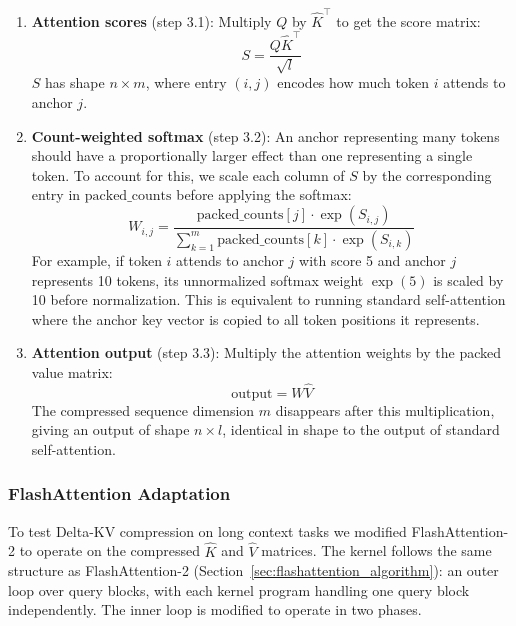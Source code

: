 \begin{enumerate}
    \item \textbf{Attention scores} (step 3.1): Multiply $Q$ by $\hat{K}^\top$ to get the score matrix:
    \begin{equation}
        S = \frac{Q\hat{K}^\top}{\sqrt{l}}
    \end{equation}
    $S$ has shape $n \times m$, where entry $(i, j)$ encodes how much token $i$ attends to anchor $j$.

    \item \textbf{Count-weighted softmax} (step 3.2): An anchor representing many tokens should have a proportionally larger effect than one representing a single token. To account for this, we scale each column of $S$ by the corresponding entry in $\text{packed\_counts}$ before applying the softmax:
    \begin{equation}
        \label{eq:count_weighted_softmax}
        W_{i,j} = \frac{\text{packed\_counts}[j] \cdot \exp(S_{i,j})}{\displaystyle\sum_{k=1}^{m} \text{packed\_counts}[k] \cdot \exp(S_{i,k})}
    \end{equation}
    For example, if token $i$ attends to anchor $j$ with score 5 and anchor $j$ represents 10 tokens, its unnormalized softmax weight $\exp(5)$ is scaled by 10 before normalization. This is equivalent to running standard self-attention where the anchor key vector is copied to all token positions it represents.

    \item \textbf{Attention output} (step 3.3): Multiply the attention weights by the packed value matrix:
    \begin{equation}
        \text{output} = W\hat{V}
    \end{equation}
    The compressed sequence dimension $m$ disappears after this multiplication, giving an output of shape $n \times l$, identical in shape to the output of standard self-attention.
\end{enumerate}

\subsubsection{FlashAttention Adaptation}
\label{sec:flash_attention_adaptation}

To test Delta-KV compression on long context tasks we modified FlashAttention-2 to operate on the compressed $\hat{K}$ and $\hat{V}$ matrices. The kernel follows the same structure as FlashAttention-2 (Section~\ref{sec:flashattention_algorithm}): an outer loop over query blocks, with each kernel program handling one query block independently. The inner loop is modified to operate in two phases.

